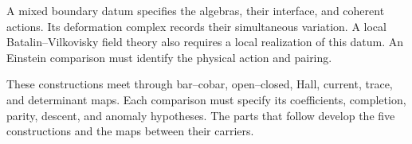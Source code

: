 A mixed boundary datum specifies the algebras, their interface, and coherent
actions. Its deformation complex records their simultaneous variation.
A local Batalin--Vilkovisky field theory also requires a local realization
of this datum. An Einstein comparison must identify the physical action
and pairing.

These constructions meet through bar--cobar, open--closed, Hall, current,
trace, and determinant maps. Each comparison must specify its coefficients,
completion, parity, descent, and anomaly hypotheses. The parts that follow
develop the five constructions and the maps between their carriers.
